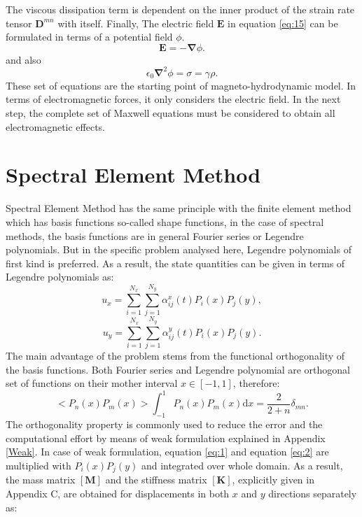 \documentclass[12pt]{report}
\begin{document}
The viscous dissipation term is dependent on the inner product of the strain rate tensor $\mathbf{D}^{mn}$ with itself. Finally,
The electric field $\mathbf{E}$ in equation \ref{eq:15} can be formulated in terms of a potential field $\phi$.
\begin{equation}
\mathbf{E}=-\mathbf{\nabla}\phi.
\end{equation}
and also 
\begin{equation}
\epsilon_0 \mathbf{\nabla}^2 \phi=\sigma=\gamma \rho.
\end{equation}
These set of equations are the starting point of magneto-hydrodynamic model. In terms of electromagnetic forces, it only considers the electric field. In the next step, the complete set of Maxwell equations \cite{IntPlasma} must be considered to obtain all electromagnetic effects. 
\section{Spectral Element Method}
Spectral Element Method has the same principle with the finite element method which has basis functions so-called shape functions, in the case of spectral methods\cite{Hesthaven}, the basis functions are in general Fourier series or Legendre polynomials. But in the specific problem analysed here, Legendre polynomials of first kind is preferred. As a result, the state quantities  can be given in terms of Legendre polynomials as:
\begin{equation}
\label{eq:30}
u_x=\sum_{i=1}^{N_x}\sum_{j=1}^{N_y}\alpha_{ij}^{x}(t) P_i(x)P_{j}(y),
\end{equation}
\begin{equation}
\label{eq:31}
u_y=\sum_{i=1}^{N_x}\sum_{j=1}^{N_y}\alpha_{ij}^{y}(t) P_i(x)P_{j}(y).
\end{equation}
The main advantage of the problem stems from the functional orthogonality of the basis functions. Both Fourier series and Legendre polynomial are orthogonal set of functions on their mother interval $x\in[-1,1]$, therefore:
\begin{equation}
\label{eq:32}
<P_n(x)P_m(x)>\int_{-1}^{1}P_n(x)P_m(x)\mathrm{d}x=\frac{2}{2+n}\delta_{mn}.
\end{equation}
The orthogonality property is commonly used to reduce the error and the computational effort by means of weak formulation explained in Appendix \ref{Weak}. In case of weak formulation, equation \ref{eq:1} and equation \ref{eq:2} are multiplied with $P_i(x)P_j(y)$ and integrated over whole domain. As a result, the mass matrix $[\mathbf{M}]$ and the stiffness matrix $[\mathbf{K}]$, explicitly given in Appendix C, are obtained for displacements in both $x$ and $y$ directions separately as:
\end{document}
